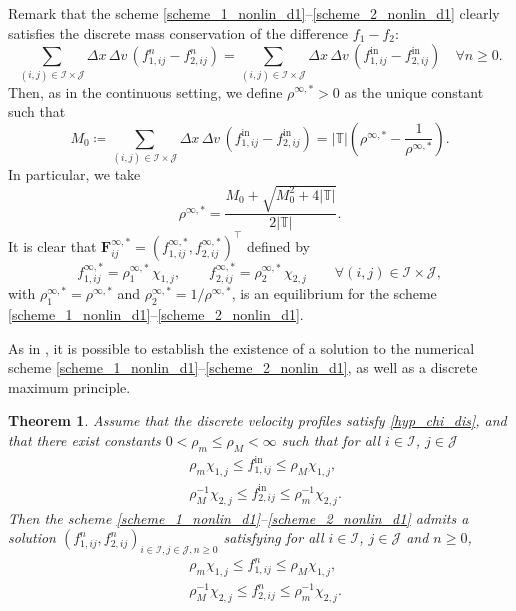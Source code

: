 \documentclass[reqno]{amsart}
\newtheorem{Theorem}{Theorem}
\newcommand{\Dx}{\Delta x}
\newcommand{\Dv}{\Delta v}
\newcommand{\T}{\mathbb{T}}
\newcommand{\II}{\mathcal{I}}
\newcommand{\J}{\mathcal{J}}
\newcommand{\Fbf}{\mathbf{F}}
\newcommand{\rhoinfs}{\rho^{\infty,*}}
\newcommand{\tin}{{\mathrm{in}}}
\numberwithin{equation}{section}
\begin{document}
Remark that the scheme \eqref{scheme_1_nonlin_d1}--\eqref{scheme_2_nonlin_d1} clearly satisfies the discrete mass conservation of the difference $f_1-f_2$:
\[\sum_{(i,j)\in\II\times\J}\Dx\,\Dv\,(f^n_{1,ij}-f^n_{2,ij})=\sum_{(i,j)\in\II\times\J}\Dx\,\Dv\,(f_{1,ij}^\tin-f_{2,ij}^\tin) \quad \forall n\geq 0.\]
Then, as in the continuous setting, we define $\rhoinfs>0$ as the unique constant such that 
\begin{equation}\label{def_rhoinf_sd}
    M_0\coloneq\sum_{(i,j)\in\II\times\J}\Dx\,\Dv\,(f_{1,ij}^\tin-f_{2,ij}^\tin)=|\T|\left(\rhoinfs-\frac{1}{\rhoinfs}\right).
\end{equation}
In particular, we take
\begin{equation}\label{def_rhoinf_sdis_full}
    \rhoinfs = \frac{M_0+\sqrt{M_0^2+4|\T|}}{2|\T|}.
\end{equation}
It is clear that $\Fbf_{ij}^{\infty,*}=(f_{1,ij}^{\infty,*},f_{2,ij}^{\infty,*})^\top$ defined by
\begin{equation}\label{def_eq_sd}
    f^{\infty,*}_{1,ij}=\rho_1^{\infty,*}\,\chi_{1,j},\qquad f^{\infty,*}_{2,ij}=\rho_2^{\infty,*}\,\chi_{2,j} \qquad \forall (i,j)\in \II\times\J,
\end{equation}
with $\rho_1^{\infty,*}=\rhoinfs$ and $\rho_2^{\infty,*}=1/\rhoinfs$, is an equilibrium for the scheme \eqref{scheme_1_nonlin_d1}--\eqref{scheme_2_nonlin_d1}.


As in \cite[Theorem 3]{BCLR2025}, it is possible to establish the existence of a solution to the numerical scheme \eqref{scheme_1_nonlin_d1}--\eqref{scheme_2_nonlin_d1}, as well as a discrete maximum principle.
\begin{Theorem}\label{thm_bounds_existence}
    Assume that the discrete velocity profiles satisfy \eqref{hyp_chi_dis}, and that there exist constants $0<\rho_m\leq \rho_M<\infty$ such that for all $i\in\II$, $j\in\J$
    \begin{align}
        &\rho_m\chi_{1,j}\leq f^{\tin}_{1,ij}\leq \rho_M\chi_{1,j}, \label{hyp.CI.1_dis}\\
        &\rho_M^{-1}\chi_{2,j}\leq f^{\tin}_{2,ij}\leq \rho_m^{-1}\chi_{2,j}. \label{hyp.CI.2_dis}
    \end{align}
    Then the scheme \eqref{scheme_1_nonlin_d1}--\eqref{scheme_2_nonlin_d1} admits a solution $(f_{1,ij}^n,f_{2,ij}^n)_{i\in\II,j\in\J,n\geq 0}$ satisfying for all $i\in\II$, $j\in\J$ and $n\geq 0$,
   \begin{align}
        &\rho_m\chi_{1,j}\leq f^{n}_{1,ij}\leq \rho_M\chi_{1,j}, \label{estimLinf_f1_d}\\
        &\rho_M^{-1}\chi_{2,j}\leq f^{n}_{2,ij}\leq \rho_m^{-1}\chi_{2,j}. \label{estimLinf_f2_d}
    \end{align} 
\end{Theorem}
\end{document}
